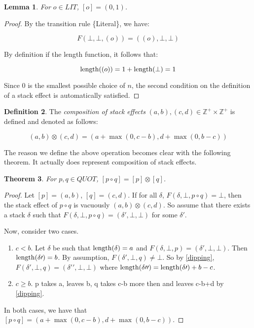\documentclass{amsart}
\theoremstyle{plain}
\newtheorem{theorem}{Theorem}[section]
\newtheorem{lemma}[theorem]{Lemma}
\theoremstyle{definition}
\newtheorem{definition}[theorem]{Definition}
\def\leng{\mathop{\rm length}}
\begin{document}
\begin{lemma}
For $o \in LIT$, $[o]=(0,1)$. 
\end{lemma}

\begin{proof}
By the transition rule \{Literal\}, we have:

$$F(\bot,\bot,(o))=((o),\bot,\bot)$$

By definition if the length function, it follows that:

$$\leng((o))=1+\leng(\bot)=1$$

Since 0 is the smallest possible choice of $n$, the second condition on the definition of a
stack effect is automatically satisfied.
\end{proof}

\begin{definition} The \emph{composition of stack effects} $(a,b), (c,d) \in \mathbb{Z}^+\times\mathbb{Z}^+$ is defined and denoted as follows:

$$(a,b) \otimes (c,d) = (a + \max(0,c-b),d + \max(0,b-c))$$

\end{definition}

The reason we define the above operation becomes clear with the following theorem.
It actually does represent composition of stack effects.

\begin{theorem}\label{iso}
For $p,q \in QUOT$, $[p\circ q]=[p]\otimes [q]$.
\end{theorem}

\begin{proof}
Let $[p]=(a,b)$, $[q]=(c,d)$.
If for all $\delta$, $F(\delta,\bot,p\circ q)=\bot$, then the stack effect of $p\circ q$ is vacuously $(a,b)\otimes(c,d)$. So assume that there exists a stack $\delta$ such that $F(\delta,\bot,p\circ q)=(\delta\prime,\bot,\bot)$ for some $\delta\prime$.

Now, consider two cases.

\begin{enumerate}
\item $c<b$. Let $\delta$ be such that $\leng(\delta)=a$ and $F(\delta,\bot,p)=(\delta\prime,\bot,\bot)$. Then $\leng(\delta\prime)=b$.
By assumption, $F(\delta\prime,\bot,q)\ne\bot$. So by \ref{dipping},
$F(\delta\prime,\bot,q)=(\delta\prime\prime,\bot,\bot)$ where $\leng(\delta\prime\prime)=\leng(\delta\prime)+b-c$.

\item $c\geq b$. p takes a, leaves b, q takes c-b more then and leaves c-b+d by \ref{dipping}.
\end{enumerate}

In both cases, we have that $[p\circ q]=(a + \max(0,c-b),d + \max(0,b-c))$.
\end{proof}
\end{document}
